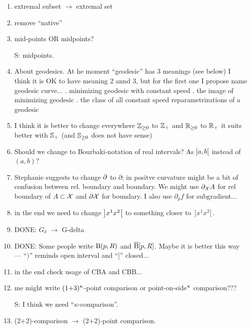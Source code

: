 \begin{enumerate}
\item extremal subset $\to$ extremal set

\item remove ``native''

\item mid-points OR midpoints?  

S: midpoints.

\item About geodesics. At he moment ``geodesic'' has 3 meanings (see below) I think it is OK to have meaning 2 annd 3, but for the first one I propose name geodesic curve...
. minimizing geodesic with constant speed
. the image of minimizing geodesic
. the class of all constant speed reparametrizations of a geodesic 

\item I think it is better to change everywhere $\ZZ_{\ge0}$ to $\mathbb{Z}_+$ and $\RR_{\ge0}$ to $\mathbb{R}_+$ it suits better with $\mathbb{S}_+$ (and $\SS_{\ge0}$ does not have sense)

\item Should we change to Bourbaki-notation of real intervals? As $\hskip-0.1em\left]a,b\right[$ instead of $(a,b)$?

\item Stephanie suggests to change $\partial$ to $\partial$; in positve curvature might be  a bit of confusion between rel. boundary and boundary. We might use $\partial_{\mathcal{X}}A$ for rel boundary of $A\subset \spc{X}$ and $\partial\mathcal{X}$ for boundary. I also use $\partial_p f$ for subgradient...

\item in the end we need to change $\hskip-0.1em\left]x^1x^2\right[$ to something closer to 
$\,{]}x^1x^2{[}\,$.

\item DONE: $G_\delta$ $\to$ G-delta

\item DONE: Some people write $\mathrm{B}{}(p,R)$ and $\overline{\mathrm{B}}{}[p,R]$. 
Maybe it is better this way --- ``$)$'' reminds open interval and ``$]$'' closed...

\item in the end check usage of CBA and CBB...

\item me might write $(1{+}3)^{\upkappa}$-point comparison or point-on-side${}^{\upkappa}$ comparison???

S: I think we need   ``$\kappa$-comparison''.

\item (2+2)-comparison $\to$ (2+2)-point comparison.


\end{enumerate}
